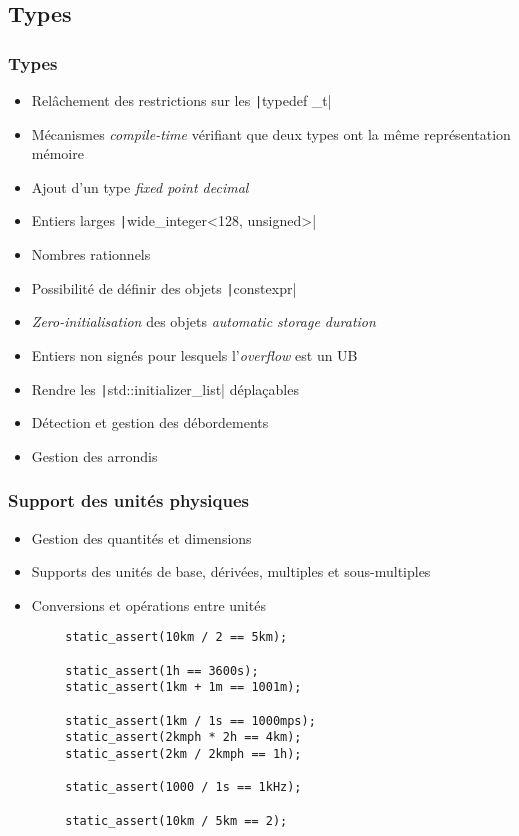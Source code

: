 \documentclass[C++.tex]{subfiles}
\begin{document}
\subsection*{Types}
\begin{frame}[fragile]
	\frametitle{Types}
	\begin{itemize}
		\item Relâchement des restrictions sur les \texttt|typedef _t|
		\item Mécanismes \textit{compile-time} vérifiant que deux types ont la même représentation mémoire


		\item Ajout d'un type \og{}\textit{fixed point decimal}\fg{}
		\item Entiers larges \texttt|wide_integer<128, unsigned>|
		\item Nombres rationnels
		\item Possibilité de définir des objets \texttt|constexpr|
		\item \textit{Zero-initialisation} des objets \textit{automatic storage duration}


		\item Entiers non signés pour lesquels l'\textit{overflow} est un UB
		\item Rendre les \texttt|std::initializer_list| déplaçables
		\item Détection et gestion des débordements
		\item Gestion des arrondis
	\end{itemize}
\end{frame}

\begin{frame}[fragile]
	\frametitle{Support des unités physiques}
	\begin{itemize}
		\item Gestion des quantités et dimensions
		\item Supports des unités de base, dérivées, multiples et sous-multiples
		\item Conversions et opérations entre unités
	\end{itemize}

	\begin{verbatim}
		static_assert(10km / 2 == 5km);

		static_assert(1h == 3600s);
		static_assert(1km + 1m == 1001m);

		static_assert(1km / 1s == 1000mps);
		static_assert(2kmph * 2h == 4km);
		static_assert(2km / 2kmph == 1h);

		static_assert(1000 / 1s == 1kHz);

		static_assert(10km / 5km == 2);
	\end{verbatim}
\end{frame}
\end{document}
